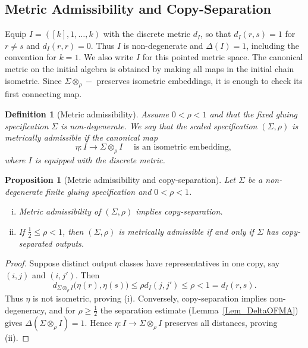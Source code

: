\documentclass{sn-jnl}%
\theoremstyle{thmstyleone}%
\newtheorem{proposition}[theorem]{Proposition}%
\theoremstyle{thmstyletwo}%
\theoremstyle{thmstylethree}%
\newtheorem{definition}{Definition}%
\newcommand{\M}{\Sigma}
\newcommand{\Fw}{\M\otimes_{\w}}
\newcommand{\w}{\rho}
\begin{document}
\subsection{Metric Admissibility and Copy-Separation}
\label{subsec_MetricAdmissibilityAndCopyseparation}

Equip $I=([k],1,\ldots,k)$ with the discrete metric $d_I$, so that $d_I(r,s)=1$ for $r\ne s$ and $d_I(r,r)=0$. Thus $I$ is non-degenerate and $\Delta(I)=1$, including the convention for $k=1$. We also write $I$ for this pointed metric space. The canonical metric on the initial algebra is obtained by making all maps in the initial chain isometric. Since $\Fw-$ preserves isometric embeddings, it is enough to check its first connecting map. 

\begin{definition}[Metric admissibility]
\label{Def_MetricAdmissibility}
    Assume $0<\w<1$ and that the fixed gluing specification $\Sigma$ is non-degenerate. We say that the scaled specification $(\Sigma,\w)$ is \emph{metrically admissible} if the canonical map
    \begin{equation}
        \eta:I\longrightarrow \Fw I \quad \text{  is an isometric embedding, }
    \label{eqn:MetricAdmisibility}
    \tag{MA}
    \end{equation}
     where $I$ is equipped with the discrete metric.
\end{definition}

\begin{proposition}[Metric admissibility and copy-separation]
    \label{Prop_MetAdimisibilityAndCS}
        Let $\Sigma$ be a non-degenerate finite gluing specification and $0<\rho<1$.
    \begin{enumerate}[(i)]
        \item \label{Lem_AdmissibilityImpliesCopySeparation}
            Metric admissibility of $(\Sigma,\rho)$ implies copy-separation.
        \item \label{Prop_RhoHalfAdmissible}
            If $\frac12\leq\rho<1$, then $(\Sigma,\rho)$ is metrically admissible if and only if $\Sigma$ has copy-separated outputs.
    \end{enumerate}
\end{proposition}

\begin{proof}
Suppose distinct output classes have representatives in one copy, say $(i,j)$ and $(i,j')$. Then
\begin{equation} 
\nonumber
    d_{\Fw I}\bigl(\eta(r),\eta(s)\bigr) \leq\rho d_I(j,j')\leq\rho<1=d_I(r,s).
\end{equation}
Thus $\eta$ is not isometric, proving (i). Conversely, copy-separation implies non-degeneracy, and for $\rho\geq\frac12$ the separation estimate (Lemma~\ref{Lem_DeltaOFMA}) gives $\Delta(\Fw I)=1$. Hence $\eta:I\to\Fw I$ preserves all distances, proving (ii).
\end{proof}
\end{document}

